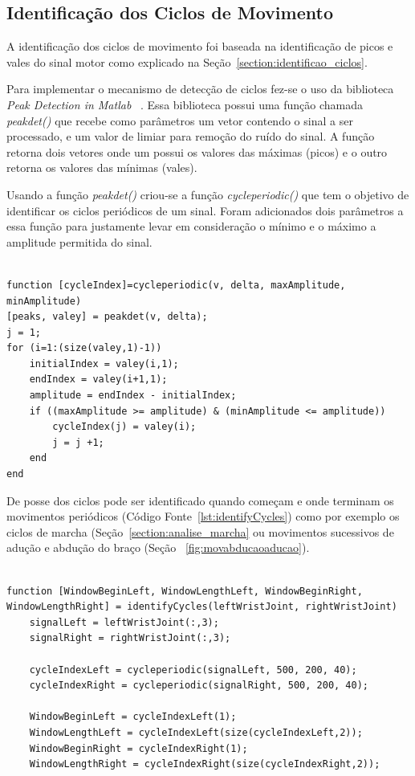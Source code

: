 \subsection{Identificação dos Ciclos de Movimento} 
A identificação dos ciclos de movimento foi baseada na identificação de picos e vales do sinal motor como explicado na Seção~\ref{section:identificao_ciclos}. 

Para implementar o mecanismo de detecção de ciclos fez-se o uso da biblioteca \textit{Peak Detection in Matlab} ~\cite{peakdetect}. Essa biblioteca possui uma função chamada \textit{peakdet()} que recebe como parâmetros um vetor contendo o sinal a ser processado, e um valor de limiar para remoção do ruído do sinal. A função retorna dois vetores onde um possui os valores das máximas (picos) e o outro retorna os valores das mínimas (vales).

Usando a função \textit{peakdet()} criou-se a função \textit{cycleperiodic()} que tem o objetivo de identificar os ciclos periódicos de um sinal. Foram adicionados dois parâmetros a essa função para justamente levar em consideração o mínimo e o máximo a amplitude permitida do sinal.

\begin{lstlisting}[frame=single, caption=Função de Ciclo Periódico]  % Start your code-block

function [cycleIndex]=cycleperiodic(v, delta, maxAmplitude, minAmplitude)
[peaks, valey] = peakdet(v, delta);
j = 1;
for (i=1:(size(valey,1)-1))    
    initialIndex = valey(i,1);
    endIndex = valey(i+1,1);
    amplitude = endIndex - initialIndex;
    if ((maxAmplitude >= amplitude) & (minAmplitude <= amplitude))
        cycleIndex(j) = valey(i);
        j = j +1;
    end
end
\end{lstlisting}

De posse dos ciclos pode ser identificado quando começam e onde terminam os movimentos periódicos (Código Fonte~\ref{lst:identifyCycles}) como por exemplo os ciclos de marcha (Seção~\ref{section:analise_marcha} ou movimentos sucessivos de adução e abdução do braço (Seção ~\ref{fig:movabducaoaducao}). 

\begin{lstlisting}[frame=single, caption=Identificar Início e Tamanho do Movimento Periódico, label=lst:identifyCycles]  % Start your code-block

function [WindowBeginLeft, WindowLengthLeft, WindowBeginRight, WindowLengthRight] = identifyCycles(leftWristJoint, rightWristJoint)
    signalLeft = leftWristJoint(:,3);
    signalRight = rightWristJoint(:,3);

    cycleIndexLeft = cycleperiodic(signalLeft, 500, 200, 40);
    cycleIndexRight = cycleperiodic(signalRight, 500, 200, 40);

    WindowBeginLeft = cycleIndexLeft(1);
    WindowLengthLeft = cycleIndexLeft(size(cycleIndexLeft,2));
    WindowBeginRight = cycleIndexRight(1);
    WindowLengthRight = cycleIndexRight(size(cycleIndexRight,2));
\end{lstlisting}

